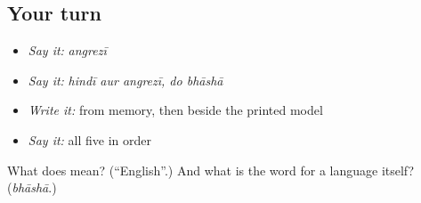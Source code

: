 \subsection*{Your turn}
\begin{itemize}
\raggedright
  \item \emph{Say it:} \emph{angrezī}
  \item \emph{Say it:} \emph{hindī aur angrezī, do bhāshā}
  \item \emph{Write it:}  from memory, then  beside the printed model
  \item \emph{Say it:} all five in order
\end{itemize}

\begin{tcolorbox}[breakable,colback=teal!4,colframe=teal!35!black,title={Before you move on}]
What does  mean? (\textquotedblleft{}English\textquotedblright{}.) And what is the word for a language itself? (\emph{bhāshā}.)
\end{tcolorbox}
